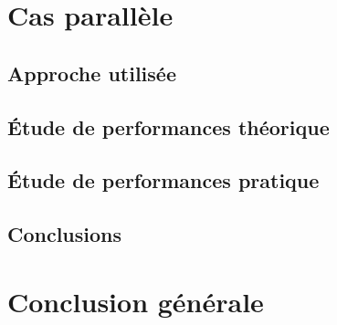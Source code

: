 \documentclass[11pt,a4paper]{article}
\begin{document}
\section{Cas parallèle}
	
	\subsection{Approche utilisée}
	\subsection{Étude de performances théorique}
	\subsection{Étude de performances pratique}
	\subsection{Conclusions}

\section{Conclusion générale}



% 
% 

%
\end{document}
